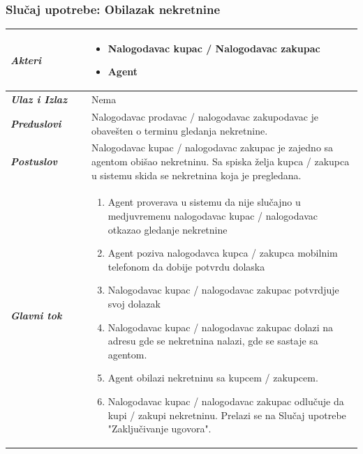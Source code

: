 \documentclass[20pt]{article}
\begin{document}
\subsubsection{\bfseries \large Slu\v{c}aj upotrebe: Obilazak nekretnine}
\begin{center}
\begin{longtable}{p{0.23\linewidth} p{0.77\linewidth}}
 \hline
 {\it \bfseries Akteri} & \begin{itemize}
    \item Nalogodavac kupac / Nalogodavac zakupac
    \item Agent
\end{itemize}\\
\hline

 {\it \bfseries Ulaz i Izlaz} & Nema\\   
 \hline
 \hline
 {\it \bfseries Preduslovi} & Nalogodavac prodavac / nalogodavac zakupodavac je obave\v sten o terminu gledanja nekretnine.\\
 \hline
 
 {\it \bfseries Postuslov} & Nalogodavac kupac / nalogodavac zakupac je zajedno sa agentom obi\v sao nekretninu. Sa spiska \v zelja kupca / zakupca u sistemu skida se nekretnina koja je pregledana.\\
 \hline


     {\it \bfseries Glavni tok} &  
     \begin{enumerate}
         \item  Agent proverava u sistemu da nije slu\v cajno u medjuvremenu nalogodavac kupac / nalogodavac otkazao gledanje nekretnine
         \item  Agent poziva nalogodavca kupca / zakupca mobilnim telefonom da dobije potvrdu dolaska
         \item  Nalogodavac kupac / nalogodavac zakupac potvrdjuje svoj dolazak
         \item  Nalogodavac kupac / nalogodavac zakupac dolazi na adresu gde se nekretnina nalazi, gde se sastaje sa agentom.
         \item Agent obilazi nekretninu sa kupcem / zakupcem.
         \item Nalogodavac kupac / nalogodavac zakupac odlu\v cuje da kupi / zakupi nekretninu. Prelazi se na Slu\v{c}aj upotrebe "Zaklju\v civanje ugovora".
    \end{enumerate}\\ 
\hline
\end{longtable}
\end{center} 
\end{document}

